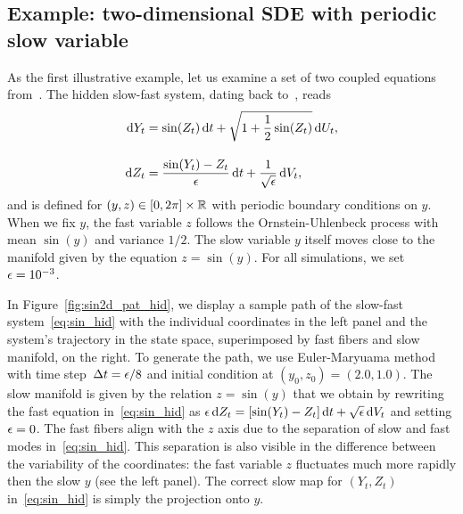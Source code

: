 \documentclass{article}
\begin{document}
\subsection{Example: two-dimensional SDE with periodic slow variable}
\label{sec:example}
As the first illustrative example, let us examine a set of two coupled equations from~\cite{froyland_trajectory-free_2016}. The hidden slow-fast system, dating back to~\cite{crommelin_reconstruction_2006}, reads
\begin{gather}\label{eq:sin_hid}
    \begin{aligned}
        \operatorname{d}\!{Y_t} &= \sin(Z_t)\operatorname{d}\!{t} + \sqrt{1+\frac{1}{2}\sin(Z_t)}\operatorname{d}\!{U_t},\\[1em]
        \operatorname{d}\!{Z_t} &= \frac{\sin(Y_t) - Z_t}{\epsilon}\operatorname{d}\!{t} + \frac{1}{\sqrt{\epsilon}}\operatorname{d}\!{V_t},
    \end{aligned}
\end{gather}
and is defined for $(y,z)\in[0,2\pi]\times\mathbb{R}$ with periodic boundary conditions on $y$. When we fix $y$, the fast variable $z$ follows the Ornstein-Uhlenbeck process with mean $\sin(y)$ and variance $1/2$. The slow variable $y$ itself moves close to the manifold given by the equation $z=\sin(y)$. For all simulations, we set $\epsilon=10^{-3}$.

In Figure~\ref{fig:sin2d_pat_hid}, we display a sample path of the slow-fast system~\eqref{eq:sin_hid} with the individual coordinates in the left panel and the system's trajectory in the state space, superimposed by fast fibers and slow manifold, on the right. To generate the path, we use Euler-Maryuama method with time step~$\Delta t=\epsilon/8$ and initial condition at $(y_0, z_0)=(2.0, 1.0)$. The slow manifold is given by the relation $z = \sin(y)$ that we obtain by rewriting the fast equation in~\eqref{eq:sin_hid} as $\epsilon\operatorname{d}\!{Z}_t = [\sin(Y_t)-Z_t]\operatorname{d}\!{t} +\sqrt{\epsilon}\operatorname{d}\!{V}_t$ and setting $\epsilon=0$. The fast fibers align with the $z$ axis due to the separation of slow and fast modes in~\eqref{eq:sin_hid}. This separation is also visible in the difference between the variability of the coordinates: the fast variable $z$ fluctuates much more rapidly then the slow $y$ (see the left panel). The correct slow map for $(Y_t, Z_t)$ in~\eqref{eq:sin_hid} is simply the projection onto $y$.
\end{document}
